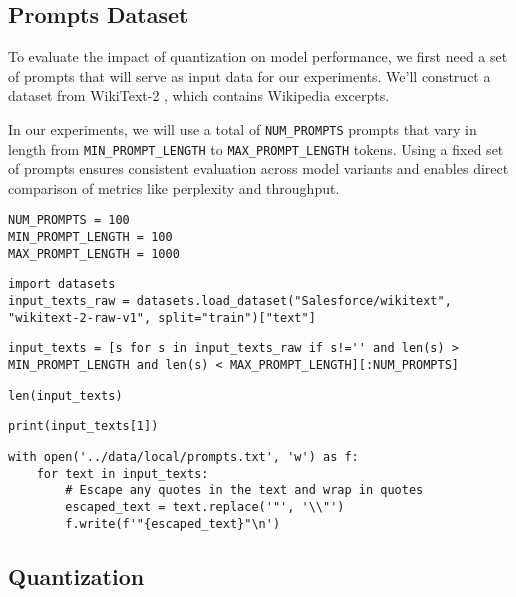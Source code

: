 \subsection{Prompts Dataset}

To evaluate the impact of quantization on model performance, we first need a set of prompts that will serve as input data for our experiments. We'll construct a dataset from WikiText-2 , which contains Wikipedia excerpts.

In our experiments, we will use a total of \texttt{NUM\_PROMPTS} prompts that vary in length from \texttt{MIN\_PROMPT\_LENGTH} to \texttt{MAX\_PROMPT\_LENGTH} tokens. Using a fixed set of prompts ensures consistent evaluation across model variants and enables direct comparison of metrics like perplexity and throughput.

\begin{verbatim}
NUM_PROMPTS = 100
MIN_PROMPT_LENGTH = 100
MAX_PROMPT_LENGTH = 1000
\end{verbatim}

\begin{verbatim}
import datasets
input_texts_raw = datasets.load_dataset("Salesforce/wikitext", "wikitext-2-raw-v1", split="train")["text"]
\end{verbatim}

\begin{verbatim}
input_texts = [s for s in input_texts_raw if s!='' and len(s) > MIN_PROMPT_LENGTH and len(s) < MAX_PROMPT_LENGTH][:NUM_PROMPTS]
\end{verbatim}

\begin{verbatim}
len(input_texts)
\end{verbatim}

\begin{verbatim}
print(input_texts[1])
\end{verbatim}

\begin{verbatim}
with open('../data/local/prompts.txt', 'w') as f:
    for text in input_texts:
        # Escape any quotes in the text and wrap in quotes
        escaped_text = text.replace('"', '\\"')
        f.write(f'"{escaped_text}"\n')
\end{verbatim}

\subsection{Quantization}

